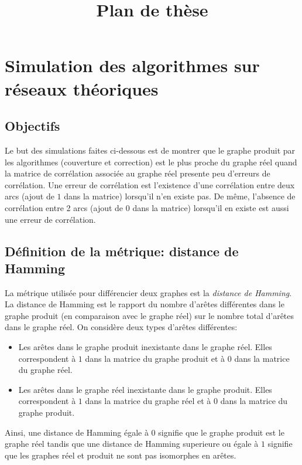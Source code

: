 \documentclass[onecolumn, 12pt]{book}
\title{Plan de th\`ese}
\date{\oldstylenums{1875}}
\begin{document}
\maketitle
\tableofcontents

\chapter{Simulation des algorithmes sur r\'eseaux th\'eoriques}

\section{Objectifs}
Le but des simulations faites ci-dessous est de montrer que le graphe produit par les algorithmes (couverture et correction) est le plus proche du graphe r\'eel quand la matrice de corr\'elation associ\'ee au graphe r\'eel presente peu d'erreurs de corr\'elation.
Une erreur de corr\'elation est l'existence d'une corr\'elation entre deux arcs (ajout de $1$ dans la matrice) lorsqu'il n'en existe pas. De m\^eme, l'absence de corr\'elation entre 2 arcs (ajout de $0$ dans la matrice) lorsqu'il en existe  est aussi une erreur de corr\'elation.


\section{D\'efinition de la m\'etrique: distance de Hamming}
La m\'etrique utilis\'ee pour diff\'erencier deux graphes est la {\em distance de Hamming}.
La distance de Hamming est le rapport du nombre d'ar\^etes diff\'erentes dans le graphe produit (en comparaison avec le graphe r\'eel) sur le nombre total d'ar\^etes dans le graphe r\'eel.
On consid\`ere deux types d'ar\^etes diff\'erentes:
\begin{itemize}
	\item Les ar\^etes dans le graphe produit inexistante dans le graphe r\'eel. Elles correspondent \`a $1$ dans la matrice du graphe produit et \`a $0$ dans la matrice du graphe r\'eel. 
	\item Les ar\^etes dans le graphe r\'eel inexistante dans le graphe produit. Elles correspondent \`a $1$ dans la matrice du graphe r\'eel et \`a $0$ dans la matrice du graphe produit. 
\end{itemize} 
Ainsi, une distance de Hamming \'egale \`a $0$ signifie que le graphe produit est le graphe r\'eel tandis que  une distance de Hamming superieure ou \'egale \`a $1$ signifie que les graphes r\'eel et produit ne sont pas isomorphes en ar\^etes. 
\end{document}
